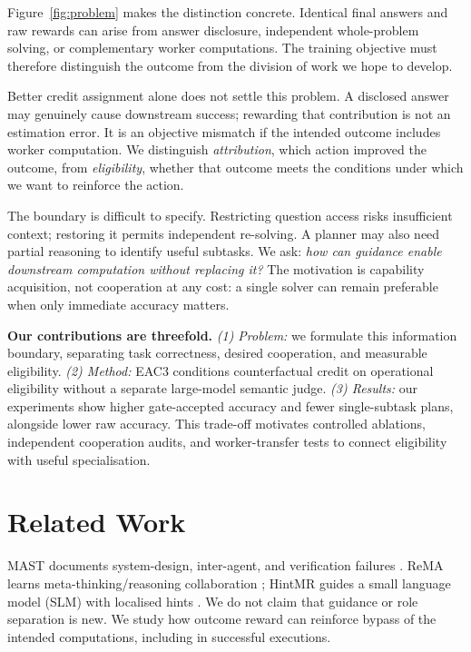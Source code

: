 \documentclass[11pt]{article}
\begin{document}
Figure~\ref{fig:problem} makes the distinction concrete. Identical final answers and raw rewards can arise from answer disclosure, independent whole-problem solving, or complementary worker computations. The training objective must therefore distinguish the outcome from the division of work we hope to develop.

Better credit assignment alone does not settle this problem. A disclosed answer may genuinely cause downstream success; rewarding that contribution is not an estimation error. It is an objective mismatch if the intended outcome includes worker computation. We distinguish \emph{attribution}, which action improved the outcome, from \emph{eligibility}, whether that outcome meets the conditions under which we want to reinforce the action.

The boundary is difficult to specify. Restricting question access risks insufficient context; restoring it permits independent re-solving. A planner may also need partial reasoning to identify useful subtasks. We ask: \emph{how can guidance enable downstream computation without replacing it?} The motivation is capability acquisition, not cooperation at any cost: a single solver can remain preferable when only immediate accuracy matters.

\textbf{Our contributions are threefold.} \emph{(1) Problem:} we formulate this information boundary, separating task correctness, desired cooperation, and measurable eligibility. \emph{(2) Method:} EAC3 conditions counterfactual credit on operational eligibility without a separate large-model semantic judge. \emph{(3) Results:} our experiments show higher gate-accepted accuracy and fewer single-subtask plans, alongside lower raw accuracy. This trade-off motivates controlled ablations, independent cooperation audits, and worker-transfer tests to connect eligibility with useful specialisation.

\section{Related Work}
MAST documents system-design, inter-agent, and verification failures \citep{cemri2025mast}. ReMA learns meta-thinking/reasoning collaboration \citep{wan2025rema}; HintMR guides a small language model (SLM) with localised hints \citep{hossain2026hintmr}. We do not claim that guidance or role separation is new. We study how outcome reward can reinforce bypass of the intended computations, including in successful executions.
\end{document}
